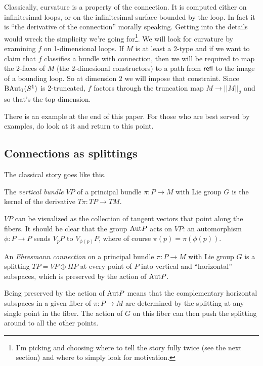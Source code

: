 \documentclass[12pt]{article}
\begin{document}
Classically, curvature is a property of the connection. It is computed either on infinitesimal loops, or on the infinitesimal surface bounded by the loop. In fact it is ``the derivative of the connection'' morally speaking. Getting into the details would wreck the simplicity we're going for\footnote{I'm picking and choosing where to tell the story fully twice (see the next section) and where to simply look for motivation.}. We will look for curvature by examining \( f \) on 1-dimensional loops. If \( M \) is at least a 2-type and if we want to claim that \( f \) classifies a bundle with connection, then we will be required to map the 2-faces of \( M \) (the 2-dimesional constructors) to a path from \( \mathsf{refl} \) to the image of a bounding loop. So at dimension 2 we will impose that constraint. Since \( \mathrm{BAut}_1(S^1) \) is 2-truncated, \( f \) factors through the truncation map \( M\to||M||_2 \) and so that's the top dimension.

There is an example at the end of this paper. For those who are best served by examples, do look at it and return to this point.



\subsection{Connections as splittings}

The classical story goes like this.

\begin{mydef}
The \emph{vertical bundle} \( VP \) of a principal bundle \( \pi:P\to M \) with Lie group \( G \) is the kernel of the derivative \( T\pi:TP\to TM \). 
\end{mydef}

\( VP \) can be visualized as the collection of tangent vectors that point along the fibers. It should be clear that the group \( \mathrm{Aut} P \) acts on \( VP \): an automorphism \( \phi:P\to P \) sends \( V_pP \) to \( V_{\phi(p)}P \), where of course \( \pi(p)=\pi(\phi(p)) \).

\begin{mydef}
An \emph{Ehresmann connection} on a principal bundle \( \pi:P\to M \) with Lie group \( G \) is a splitting \( TP=VP\oplus HP \) at every point of \( P \) into vertical and ``horizontal'' subspaces, which is preserved by the action of \( \mathrm{Aut} P \).
\end{mydef}

Being preserved by the action of \( \mathrm{Aut} P \) means that the complementary horizontal subspaces in a given fiber of \( \pi:P\to M \) are determined by the splitting at any single point in the fiber. The action of \( G \) on this fiber can then push the splitting around to all the other points.
\end{document}
